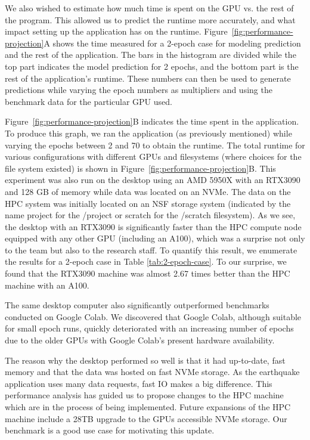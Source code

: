 We also wished to estimate how much time is spent on the GPU vs. the rest of the program. This allowed us to predict the runtime more accurately, and what impact setting up the application has on the runtime.  Figure~\ref{fig:performance-projection}A shows the time measured for a 2-epoch case for modeling prediction and the rest of the application. The bars in the histogram are divided while the top part indicates the model prediction for 2 epochs, and the bottom part is the rest of the application's runtime. These numbers can then be used to generate predictions while varying the epoch numbers as multipliers and using the benchmark data for the particular GPU used.

Figure~\ref{fig:performance-projection}B indicates the time spent in the application. To produce this graph, we ran the application (as previously mentioned) while varying the epochs between 2 and 70 to obtain the runtime. The total runtime for various configurations with different GPUs and filesystems (where choices for the file system existed) is shown in Figure~\ref{fig:performance-projection}B. This experiment was also run on the desktop using an AMD 5950X with an RTX3090 and 128 GB of memory while data was located on an NVMe. The data on the HPC system was initially located on an NSF storage system (indicated by the name project for the /project or scratch for the /scratch filesystem). As we see, the desktop with an RTX3090 is significantly faster than the HPC compute node equipped with any other GPU (including an A100), which was a surprise not only to the team but also to the research staff. To quantify this result, we enumerate the results for a 2-epoch case in Table \ref{tab:2-epoch-case}. To our surprise, we found that the RTX3090 machine was almost 2.67 times better than the HPC machine with an A100.

The same desktop computer also significantly outperformed benchmarks conducted on Google Colab. We discovered that Google Colab, although suitable for small epoch runs, quickly deteriorated with an increasing number of epochs due to the older GPUs with Google Colab's present hardware availability.

The reason why the desktop performed so well is that it had up-to-date, fast memory and that the data was hosted on fast NVMe storage. As the earthquake application uses many data requests, fast IO makes a big difference. This performance analysis has guided us to propose changes to the HPC machine which are in the process of being implemented. Future expansions of the HPC machine include a 28TB upgrade to the GPUs accessible NVMe storage. Our benchmark is a good use case for motivating this update.

